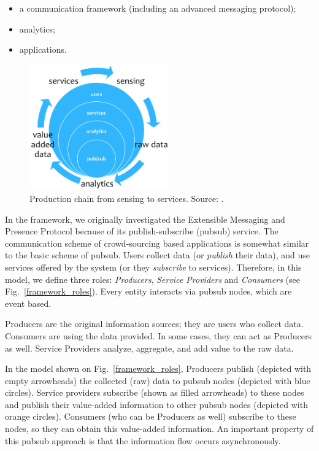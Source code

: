 \documentclass[b5paper,12pt]{report}
\theoremstyle{definition}
\begin{document}
\begin{itemize}
\item a communication framework (including an advanced messaging protocol);
\item analytics;
\item applications.
\end{itemize}

\begin{figure}[ht!]
\centerline{
\includegraphics[width=6cm]{img/framework_layers.png}}
\caption{Production chain from sensing to services. Source: \cite{szabo2013framework}.}
\label{framework_layers}
\end{figure}

In the framework, we originally investigated the Extensible Messaging and Presence Protocol \cite{saint2011extensible} because of its publish-subscribe (pubsub) \cite{millard2010xep} service. The communication scheme of crowd-sourcing based applications is somewhat similar to the basic scheme of pubsub. Users collect data (or \textit{publish} their data), and use services offered by the system (or they \textit{subscribe} to services). Therefore, in this model, we define three roles: \textit{Producers}, \textit{Service Providers} and \textit{Consumers} (see Fig.~\ref{framework_roles}). Every entity interacts via pubsub nodes, which are event based.

Producers are the original information sources; they are users who collect data. Consumers are using the data provided. In some cases, they can act as Producers as well. Service Providers analyze, aggregate, and add value to the raw data.

In the model shown on Fig.~\ref{framework_roles}, Producers publish (depicted with empty arrowheads) the collected (raw) data to pubsub nodes (depicted with blue circles). Service providers subscribe (shown as filled arrowheads) to these nodes and publish their value-added information to other pubsub nodes (depicted with orange circles). Consumers (who can be Producers as well) subscribe to these nodes, so they can obtain this value-added information. An important property of this pubsub approach is that the information flow occurs asynchronously.
\end{document}
